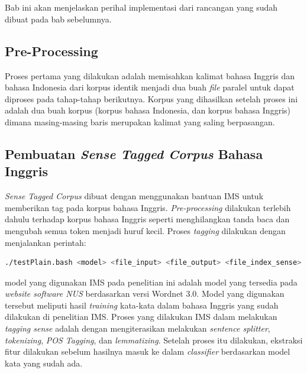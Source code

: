 \chapter{\babEmpat} \label{implementasi}
Bab ini akan menjelaskan perihal implementasi dari rancangan yang sudah dibuat pada bab sebelumnya.

\section{Pre-Processing}
Proses pertama yang dilakukan adalah memisahkan kalimat bahasa Inggris dan bahasa Indonesia dari korpus identik menjadi dua buah \textit{file} paralel untuk dapat diproses pada tahap-tahap berikutnya. Korpus yang dihasilkan setelah proses ini adalah dua buah korpus (korpus bahasa Indonesia, dan korpus bahasa Inggris) dimana masing-masing baris merupakan kalimat yang saling berpasangan.


\section{Pembuatan \textit{Sense Tagged Corpus} Bahasa Inggris}
\textit{Sense Tagged Corpus} dibuat dengan menggunakan bantuan IMS untuk memberikan tag pada korpus bahasa Inggris. \textit{Pre-processing} dilakukan terlebih dahulu terhadap korpus bahasa Inggris seperti menghilangkan tanda baca dan mengubah semua token menjadi huruf kecil. Proses \textit{tagging} dilakukan dengan menjalankan perintah:

\begin{lstlisting}[language=bash, caption={IMS}, label={IMS}]
./testPlain.bash <model> <file_input> <file_output> <file_index_sense>
\end{lstlisting}

model yang digunakan IMS pada penelitian ini adalah model yang tersedia pada \textit{website software NUS} berdasarkan versi Wordnet 3.0. Model yang digunakan tersebut meliputi hasil \textit{training} kata-kata dalam bahasa Inggris yang sudah dilakukan di penelitian IMS. Proses yang dilakukan IMS dalam melakukan \textit{tagging sense} adalah dengan mengiterasikan melakukan \textit{sentence splitter}, \textit{tokenizing}, \textit{POS Tagging}, dan \textit{lemmatizing}. Setelah proses itu dilakukan, ekstraksi fitur dilakukan sebelum hasilnya masuk ke dalam \textit{classifier} berdasarkan model kata yang sudah ada. 


